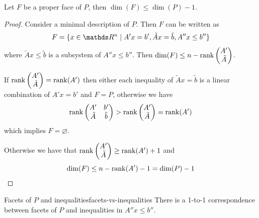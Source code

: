 \documentclass[12pt]{extarticle}
\begin{document}
\begin{corollary}{}{}
	Let $F$ be a proper face of $P$, then $\dim(F) \leq \dim(P) -1$.
\end{corollary}

\begin{proof}
	Consider a minimal description of $P$.
	Then $F$ can be written as
	\begin{equation}
		F = \{ x \in \R^n \mid A'x = b', \tilde A x = \tilde b, A'' x \leq b'' \}
	\end{equation}
	where $\tilde A x \leq \tilde b$ is a subsystem of $A '' x \leq b ''$.
	Then $\dim(F) \leq n - \rank\begin{pmatrix} A' \\ \tilde A \end{pmatrix}$.

	If $\rank\begin{pmatrix} A' \\ \tilde A \end{pmatrix} = \mathrm{rank}(A')$ then
	either each inequality of $\tilde A x = \tilde b$ is a linear combination of $A' x = b'$
	and $F = P$, otherwise we have
	\begin{equation}
		\rank \begin{pmatrix} A' & b' \\ \tilde A & \tilde b \end{pmatrix} >
		\rank \begin{pmatrix} A' \\ \tilde A \end{pmatrix} = \mathrm{rank}(A')
	\end{equation}
	which implies $F = \varnothing$.

	Otherwise we have that
	$\rank \begin{pmatrix} A' \\ \tilde A \end{pmatrix} \geq \mathrm{rank}(A') + 1$
	and
	\begin{equation}
		\dim(F) \leq n - \rank(A') - 1 = \dim(P) -1 \qedhere
	\end{equation}
\end{proof}

\begin{theorem}{Facets of $P$ and inequalities}{facets-vs-inequalities}
	There is a 1-to-1 correspondence between facets of $P$ and inequalities in $A'' x \leq b''$.
\end{theorem}
\end{document}
